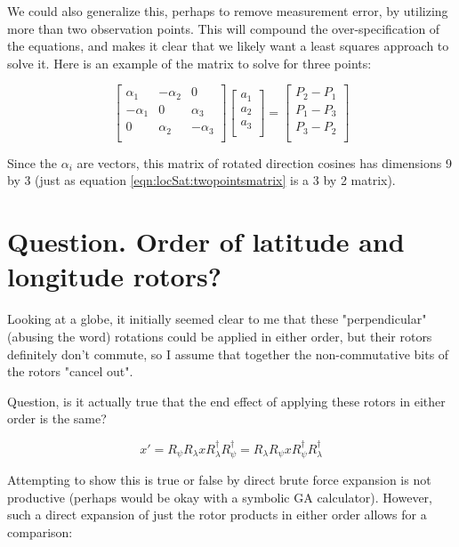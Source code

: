 We could also generalize this, perhaps to remove measurement error, by utilizing more than two observation points.  This will compound the over-specification of the equations, and makes it clear that we likely want a least squares approach to solve it.
Here is an example of the matrix to solve for three points:

\begin{equation}\label{eqn:locSat:threepointsmatrix}
\begin{bmatrix}
\alpha_1 & -\alpha_2 & 0 \\
-\alpha_1 & 0 & \alpha_3 \\
0 & \alpha_2 & -\alpha_3 \\
\end{bmatrix}
\begin{bmatrix}
a_1 \\
a_2 \\
a_3 \\
\end{bmatrix}
= 
\begin{bmatrix}
P_2 - P_1 \\
P_1 - P_3 \\
P_3 - P_2 \\
\end{bmatrix}
\end{equation}

Since the $\alpha_i$ are vectors, this matrix of rotated direction cosines has dimensions 9 by 3 (just as equation \ref{eqn:locSat:twopointsmatrix} is a 3 by 2 matrix).

\section{Question.  Order of latitude and longitude rotors? }

Looking at a globe, it initially seemed clear to me that these "perpendicular" (abusing the word) rotations could be applied in either order, but their rotors definitely don't commute, so I assume that together the non-commutative bits of the rotors "cancel out".

Question, is it actually true that the end effect of applying these rotors in either order is the same?

\[
x' = R_{\psi} R_{\lambda} x R_{\lambda}^\dagger R_{\psi}^\dagger = R_{\lambda} R_{\psi} x R_{\psi}^\dagger R_{\lambda}^\dagger
\]

Attempting to show this is true or false by direct brute force expansion is not productive (perhaps would be okay with a symbolic GA calculator).  However, such a direct expansion 
of just the rotor products in either order allows for a comparison:

